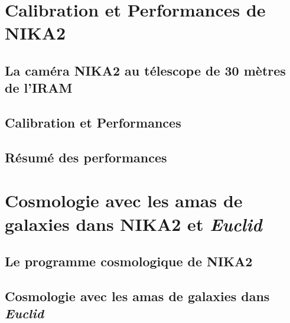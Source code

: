 \documentclass[a4paper, 12pt]{report}
\begin{document}
\part{Calibration et Performances de NIKA2}
%
%   
%
\chapter{La caméra NIKA2 au télescope de 30 mètres de l'IRAM}

%
%   
%
\chapter{Calibration et Performances}


%
%   
%
\chapter{Résumé des performances}


%
%
%
%
%
%
%

\part{Cosmologie avec les amas de galaxies dans NIKA2 et \emph{Euclid}}
%
%
\chapter{Le programme cosmologique de NIKA2}


%
%
\chapter{Cosmologie avec les amas de galaxies dans \emph{Euclid}}




%


\end{document}
